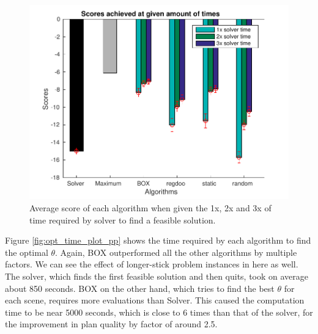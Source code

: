 \begin{figure}[htb]
\centering
\includegraphics[scale=0.5]{./figures/place_and_partial_path_opt_plot.pdf}
\caption{ Average score of each algorithm when given the 1x, 2x and 3x of time required by solver to find a feasible solution. }
\label{fig:opt_plot_pp}
\end{figure} 

Figure \ref{fig:opt_time_plot_pp} shows the time required by each algorithm
to find the optimal $\theta$. Again, BOX outperformed all the other algorithms
by multiple factors. We can see the effect of longer-stick problem instances
in here as well. The solver, which finds the first feasible solution and
then quits, took on average about 850 seconds. BOX on the other hand,
which tries to find the best $\theta$ for each scene, requires more evaluations
than Solver. This caused the computation time to be near 5000 seconds, which
is close to 6 times than that of the solver, for the improvement in plan quality
by factor of around 2.5.


